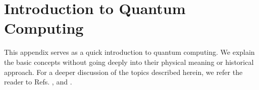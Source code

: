 
\chapter{Introduction to Quantum Computing} %
This appendix serves as a quick introduction to quantum computing. We explain the basic concepts without going deeply into their physical meaning or historical approach. For a deeper discussion of the topics described herein, we refer the reader to Refs. \cite{W.Bryon1992HilbertFunctions},  \cite{Scherer2019MathematicsComputing} and \cite{Nielsen2010QuantumInformation}.
\label{AppendixA} %
